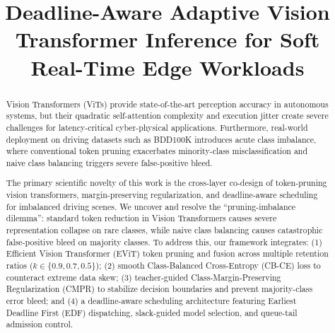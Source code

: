 \documentclass[conference]{IEEEtran}
\begin{document}
\title{Deadline-Aware Adaptive Vision Transformer Inference for Soft Real-Time Edge Workloads}

\author{
}

\maketitle

\begin{abstract}
Vision Transformers (ViTs) provide state-of-the-art perception accuracy in autonomous systems, but their quadratic self-attention complexity and execution jitter create severe challenges for latency-critical cyber-physical applications. Furthermore, real-world deployment on driving datasets such as BDD100K introduces acute class imbalance, where conventional token pruning exacerbates minority-class misclassification and naive class balancing triggers severe false-positive bleed. 

The primary scientific novelty of this work is the cross-layer co-design of token-pruning vision transformers, margin-preserving regularization, and deadline-aware scheduling for imbalanced driving scenes. We uncover and resolve the ``pruning-imbalance dilemma'': standard token reduction in Vision Transformers causes severe representation collapse on rare classes, while naive class balancing causes catastrophic false-positive bleed on majority classes. To address this, our framework integrates: (1) Efficient Vision Transformer (EViT) token pruning and fusion across multiple retention ratios ($k \in \{0.9, 0.7, 0.5\}$); (2) smooth Class-Balanced Cross-Entropy (CB-CE) loss to counteract extreme data skew; (3) teacher-guided Class-Margin-Preserving Regularization (CMPR) to stabilize decision boundaries and prevent majority-class error bleed; and (4) a deadline-aware scheduling architecture featuring Earliest Deadline First (EDF) dispatching, slack-guided model selection, and queue-tail admission control.


\end{abstract}
\end{document}
